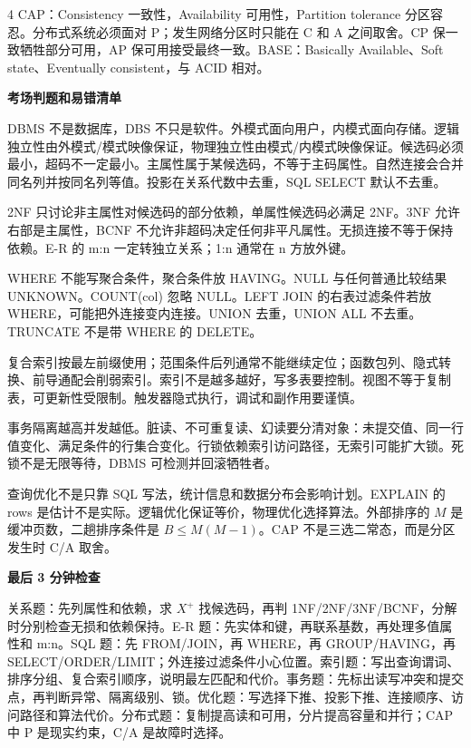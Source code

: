 \documentclass[UTF8]{ctexart}
\newcommand{\blk}[1]{\vspace{0.8pt}\noindent\colorbox{black!10}{\parbox{\dimexpr\linewidth-2\fboxsep}{\bfseries #1}}\vspace{0.6pt}}
\begin{document}
\begin{multicols*}{4}
CAP：Consistency 一致性，Availability 可用性，Partition tolerance 分区容忍。分布式系统必须面对 P；发生网络分区时只能在 C 和 A 之间取舍。CP 保一致牺牲部分可用，AP 保可用接受最终一致。BASE：Basically Available、Soft state、Eventually consistent，与 ACID 相对。

\blk{考场判题和易错清单}
DBMS 不是数据库，DBS 不只是软件。外模式面向用户，内模式面向存储。逻辑独立性由外模式/模式映像保证，物理独立性由模式/内模式映像保证。候选码必须最小，超码不一定最小。主属性属于某候选码，不等于主码属性。自然连接会合并同名列并按同名列等值。投影在关系代数中去重，SQL SELECT 默认不去重。

2NF 只讨论非主属性对候选码的部分依赖，单属性候选码必满足 2NF。3NF 允许右部是主属性，BCNF 不允许非超码决定任何非平凡属性。无损连接不等于保持依赖。E-R 的 m:n 一定转独立关系；1:n 通常在 n 方放外键。

WHERE 不能写聚合条件，聚合条件放 HAVING。NULL 与任何普通比较结果 UNKNOWN。COUNT(col) 忽略 NULL。LEFT JOIN 的右表过滤条件若放 WHERE，可能把外连接变内连接。UNION 去重，UNION ALL 不去重。TRUNCATE 不是带 WHERE 的 DELETE。

复合索引按最左前缀使用；范围条件后列通常不能继续定位；函数包列、隐式转换、前导通配会削弱索引。索引不是越多越好，写多表要控制。视图不等于复制表，可更新性受限制。触发器隐式执行，调试和副作用要谨慎。

事务隔离越高并发越低。脏读、不可重复读、幻读要分清对象：未提交值、同一行值变化、满足条件的行集合变化。行锁依赖索引访问路径，无索引可能扩大锁。死锁不是无限等待，DBMS 可检测并回滚牺牲者。

查询优化不是只靠 SQL 写法，统计信息和数据分布会影响计划。EXPLAIN 的 rows 是估计不是实际。逻辑优化保证等价，物理优化选择算法。外部排序的 $M$ 是缓冲页数，二趟排序条件是 $B\le M(M-1)$。CAP 不是三选二常态，而是分区发生时 C/A 取舍。

\blk{最后 3 分钟检查}
关系题：先列属性和依赖，求 $X^+$ 找候选码，再判 1NF/2NF/3NF/BCNF，分解时分别检查无损和依赖保持。E-R 题：先实体和键，再联系基数，再处理多值属性和 m:n。SQL 题：先 FROM/JOIN，再 WHERE，再 GROUP/HAVING，再 SELECT/ORDER/LIMIT；外连接过滤条件小心位置。索引题：写出查询谓词、排序分组、复合索引顺序，说明最左匹配和代价。事务题：先标出读写冲突和提交点，再判断异常、隔离级别、锁。优化题：写选择下推、投影下推、连接顺序、访问路径和算法代价。分布式题：复制提高读和可用，分片提高容量和并行；CAP 中 P 是现实约束，C/A 是故障时选择。
\end{multicols*}
\end{document}

